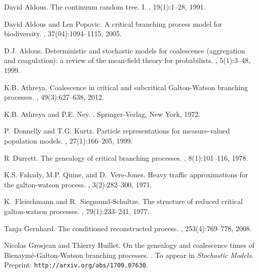 \documentclass{article}
\theoremstyle{plain}
\theoremstyle{definition}
\begin{document}

\def\cprime{$'$}
\begin{thebibliography}{10}

David Aldous.
\newblock The continuum random tree. {I}.
, 19(1):1--28, 1991.

David Aldous and Lea Popovic.
\newblock A critical branching process model for biodiversity.
, 37(04):1094--1115, 2005.

D.J. Aldous.
\newblock Deterministic and stochastic models for coalescence (aggregation and
  coagulation): a review of the mean-field theory for probabilists.
, 5(1):3--48, 1999.

K.B. Athreya.
\newblock Coalescence in critical and subcritical {G}alton-{W}atson branching
  processes.
, 49(3):627--638, 2012.

K.B. Athreya and P.E. Ney.
.
\newblock Springer-Verlag, New York, 1972.

P.~Donnelly and T.G. Kurtz.
\newblock Particle representations for measure-valued population models.
, 27(1):166--205, 1999.

R~Durrett.
\newblock The genealogy of critical branching processes.
, 8(1):101--116,
  1978.

K.S. Fahady, M.P. Quine, and D.~Vere-Jones.
\newblock Heavy traffic approximations for the galton-watson process.
, 3(2):282--300, 1971.

K.~Fleischmann and R.~Siegmund-Schultze.
\newblock The structure of reduced critical galton-watson processes.
, 79(1):233--241, 1977.

Tanja Gernhard.
\newblock The conditioned reconstructed process.
, 253(4):769--778, 2008.

Nicolas Grosjean and Thierry Huillet.
\newblock On the genealogy and coalescence times of
  {B}ienaym{\'{e}}-{G}alton-{W}atson branching processes.
.
\newblock To appear in \emph{Stochastic Models}. Preprint:
  \texttt{http://arxiv.org/abs/1709.07630}.


\end{thebibliography}
\end{document}
